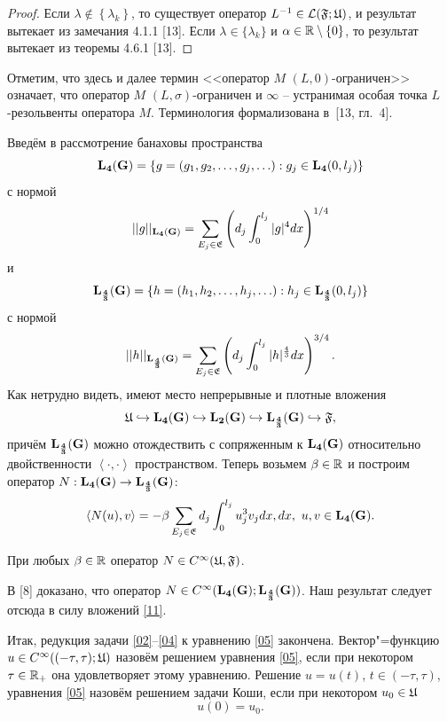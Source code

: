 \begin{proof} Если $\lambda\notin\left\{\lambda_k\right\}$, то  существует оператор $L^{-1}\in {\cal L} (\frak F; \frak U)$, и результат вытекает из замечания 4.1.1 [13]. Если $\lambda\in\{\lambda_k\}$ и $\alpha\in {\Bbb R}\setminus\{0\}$, то результат вытекает из теоремы 4.6.1 [13]. \end{proof}
 
 \smallskip

Отметим, что здесь и далее термин <<оператор $M$ $(L, 0)$-ограничен>> означает, что оператор $M$ $(L, \sigma)$-ограничен и $\infty$ -- устранимая особая точка $L$-резольвенты оператора $M$. Терминология формализована в~[13, гл.~4].

Введём в рассмотрение    банаховы пространства $${\bf L_4 (G)} = \{g=(g_1, g_2, \ldots, g_j, \ldots) : g_j\in {\bf L_4 }(0, l_j) \}$$ 
с нормой $$||g||_{\bf L_4 (G)} = \sum_{E_j\in\frak E} \left(d_j\int ^{l_j}_{0} |g|^4 dx\right)^{1/4}$$ и  $${\bf L_{\frac{4}{3}} (G)} = \{h=(h_1, h_2, \ldots, h_j, \ldots) : h_j\in {\bf L_{\frac{4}{3}} }(0, l_j) \}$$ с нормой $$||h||_{\bf L_{\frac{4}{3}} (G)} = \sum_{E_j\in\frak E} \left(d_j\int ^{l_j}_{0} |h|^{\frac{4}{3}} dx\right)^{3/4}.$$
Как нетрудно видеть, имеют место непрерывные и плотные вложения
\begin{equation} \label{11}
{\frak U}\hookrightarrow {\bf L_4 (G)}\hookrightarrow {\bf L_2 (G)}\hookrightarrow {\bf L_{\frac{4}{3}} (G)} \hookrightarrow \frak F,
\end{equation}
причём ${\bf L_{\frac{4}{3}} (G)}$ можно отождествить с сопряженным к ${\bf L_{4} (G)}$ относительно двойственности $\left\langle \cdot, \cdot \right\rangle$ пространством. Теперь возьмем $\beta\in\Bbb R$ и построим оператор $N : {\bf L_{4} (G)}\to {\bf L_{\frac{4}{3}} (G)}$: 
$$\left\langle N(u), v\right\rangle = -\beta\sum_{E_j\in\frak E}d_j\int ^{l_j}_{0} u^3_jv_jdx, dx,\,\, u, v\in {\bf L_{4} (G)}.$$

\smallskip

\begin{lemma}[1.2] При любых $\beta\in\Bbb R$ оператор $N\in C^\infty (\frak U, \frak F)$.\end{lemma}

\smallskip

В [8] доказано, что оператор $N\in C^\infty ({\bf L_{4} (G)}; {\bf L_{\frac{4}{3}} (G)})$. Наш результат следует отсюда в силу вложений \eqref{11}.

Итак, редукция задачи \eqref{02}--\eqref{04} к уравнению \eqref{05} закончена. 
Вектор"=функцию $u\in C^\infty ((-\tau, \tau); \frak U)$ назовём решением уравнения \eqref{05}, 
если при некотором $\tau\in\Bbb R_+$ она удовлетворяет этому уравнению. 
Решение $u=u(t)$, $t\in (-\tau, \tau)$, уравнения \eqref{05} назовём решением задачи Коши, если при некотором $u_0\in \frak U$ \begin{equation}\label{1.2} u(0)=u_0.\end{equation}

